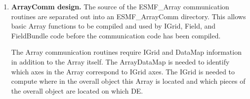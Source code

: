 \begin{enumerate}
\item{\bf ArrayComm design.}
The source of the ESMF\_Array communication routines are separated out into 
an ESMF\_ArrayComm directory.  This allows basic Array functions to be
compiled and used by IGrid, Field, and FieldBundle code before the communication
code has been compiled.  

The Array communication routines require IGrid and DataMap information in 
addition to the Array itself.   The ArrayDataMap is needed to identify which
axes in the Array correspond to IGrid axes.  The IGrid is needed to compute
where in the overall object this Array is located and which pieces of
the overall object are located on which DE.


\end{enumerate}






